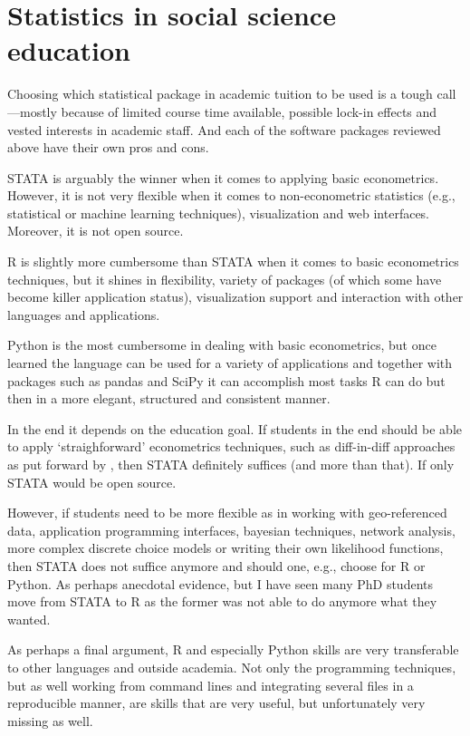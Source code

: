 \documentclass[fleqn,10pt]{SelfArx} %
\begin{document}
\section*{Statistics in social science education}

Choosing which statistical package in academic tuition to be used is a tough call---mostly because of limited course time available, possible lock-in effects and vested interests in academic staff. And each of the software packages reviewed above have their own pros and cons. 

STATA is arguably the winner when it comes to applying basic econometrics. However, it is not very flexible when it comes to non-econometric statistics (e.g., statistical or machine learning techniques), visualization and web interfaces. Moreover, it is not open source.

R is slightly more cumbersome than STATA when it comes to basic econometrics techniques, but it shines in flexibility, variety of packages (of which some have become killer application status), visualization support and interaction with other languages and applications. 

Python is the most cumbersome in dealing with basic econometrics, but once learned the language can be used for a variety of applications and together with packages such as pandas and SciPy it can accomplish most tasks R can do but then in a more elegant, structured and consistent manner.

In the end it depends on the education goal. If students in the end should be able to apply `straighforward' econometrics techniques, such as diff-in-diff approaches as put forward by \citet{angrist2008mostly}, then STATA definitely suffices (and more than that). If only STATA would be open source.

However, if students need to be more flexible as in working with geo-referenced data, application programming interfaces, bayesian techniques, network analysis, more complex discrete choice models or writing their own likelihood functions, then STATA does not suffice anymore and should one, e.g., choose for R or Python. As perhaps anecdotal evidence, but I have seen many PhD students move from STATA to R as the former was not able to do anymore what they wanted. 

As perhaps a final argument, R and especially Python skills are very transferable to other languages and outside academia. Not only the programming techniques, but as well working from command lines and integrating several files in a reproducible manner, are skills that are very useful, but unfortunately very missing as well.
\end{document}
